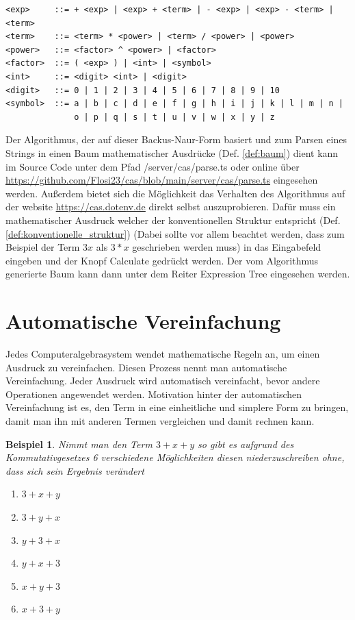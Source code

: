 \documentclass[11pt]{article}
\newcommand{\lab}[1]{(Def. \ref{#1})}
\newtheorem{example}{Beispiel}
\begin{document}
\begin{verbatim}
<exp>     ::= + <exp> | <exp> + <term> | - <exp> | <exp> - <term> | <term> 
<term>    ::= <term> * <power> | <term> / <power> | <power>
<power>   ::= <factor> ^ <power> | <factor>
<factor>  ::= ( <exp> ) | <int> | <symbol> 
<int>     ::= <digit> <int> | <digit>
<digit>   ::= 0 | 1 | 2 | 3 | 4 | 5 | 6 | 7 | 8 | 9 | 10
<symbol>  ::= a | b | c | d | e | f | g | h | i | j | k | l | m | n | 
              o | p | q | s | t | u | v | w | x | y | z
\end{verbatim}

Der Algorithmus, der auf dieser Backus-Naur-Form basiert und zum Parsen eines Strings in einen
Baum mathematischer Ausdrücke \lab{def:baum} dient kann im Source Code unter dem Pfad /server/cas/parse.ts 
oder online über \url{https://github.com/Flosi23/cas/blob/main/server/cas/parse.ts} eingesehen werden. \newline
Außerdem bietet sich die Möglichkeit das Verhalten des Algorithmus auf der website  \url{https://cas.dotenv.de}
direkt selbst auszuprobieren. Dafür muss ein mathematischer Ausdruck welcher der konventionellen Struktur 
entspricht \lab{def:konventionelle_struktur}
(Dabei sollte vor allem beachtet werden, dass zum Beispiel der Term $3x$ als $3*x$ geschrieben werden muss)
in das Eingabefeld eingeben und der Knopf \glqq Calculate\grqq{}  gedrückt werden. 
Der vom Algorithmus generierte Baum kann dann unter dem Reiter \glqq Expression Tree\grqq{} eingesehen werden.

\section{Automatische Vereinfachung}

Jedes Computeralgebrasystem wendet mathematische Regeln an, um einen Ausdruck zu vereinfachen. 
Diesen Prozess nennt man automatische Vereinfachung. 
Jeder Ausdruck wird automatisch vereinfacht, bevor andere Operationen angewendet werden. 
Motivation hinter der automatischen Vereinfachung ist es, den Term in eine einheitliche und simplere Form zu bringen, 
damit man ihn mit anderen Termen vergleichen und damit rechnen kann. 

\begin{example}
Nimmt man den Term $3+x+y$ so gibt es aufgrund des Kommutativgesetzes 6 verschiedene Möglichkeiten diesen
niederzuschreiben ohne, dass sich sein Ergebnis verändert
\begin{enumerate}
  \item $3+x+y$
  \item $3+y+x$
  \item $y+3+x$
  \item $y+x+3$
  \item $x+y+3$
  \item $x+3+y$
\end{enumerate}
\end{example}
\end{document}
